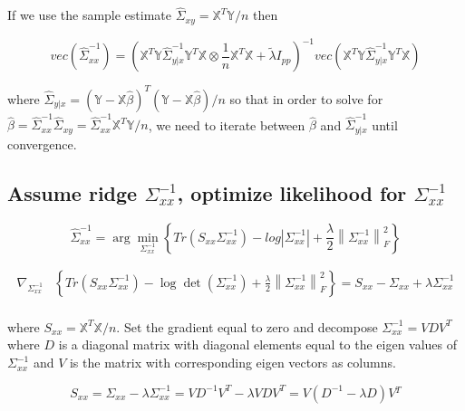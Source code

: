 \documentclass[11pt,]{book}
\theoremstyle{definition}
\theoremstyle{definition}
\theoremstyle{definition}
\theoremstyle{remark}
\begin{document}
If we use the sample estimate
\(\hat{\Sigma}_{xy} = \mathbb{X}^{T}\mathbb{Y}/n\) then

\[ vec\left( \hat{\Sigma}_{xx}^{-1} \right) = \left( \mathbb{X}^{T}\mathbb{Y}\hat{\Sigma}_{y | x}^{-1}\mathbb{Y}^{T}\mathbb{X} \otimes \frac{1}{n}\mathbb{X}^{T}\mathbb{X} + \tilde{\lambda}I_{pp} \right)^{-1}vec\left( \mathbb{X}^{T}\mathbb{Y}\hat{\Sigma}_{y | x}^{-1}\mathbb{Y}^{T}\mathbb{X} \right) \]

where
\(\hat{\Sigma}_{y | x} = (\mathbb{Y} - \mathbb{X}\hat{\beta} )^{T}(\mathbb{Y} - \mathbb{X}\hat{\beta})/n\)
so that in order to solve for
\(\hat{\beta} = \hat{\Sigma}_{xx}^{-1}\hat{\Sigma}_{xy} = \hat{\Sigma}_{xx}^{-1}\mathbb{X}^{T}\mathbb{Y}/n\),
we need to iterate between \(\hat{\beta}\) and
\(\hat{\Sigma}_{y | x}^{-1}\) until convergence.

\vspace{0.5cm}

\hypertarget{assume-ridge-sigma_xx-1-optimize-likelihood-for-sigma_xx-1}{%
\subsection{\texorpdfstring{Assume ridge \(\Sigma_{xx}^{-1}\), optimize
likelihood for
\(\Sigma_{xx}^{-1}\)}{Assume ridge \textbackslash{}Sigma\_\{xx\}\^{}\{-1\}, optimize likelihood for \textbackslash{}Sigma\_\{xx\}\^{}\{-1\}}}\label{assume-ridge-sigma_xx-1-optimize-likelihood-for-sigma_xx-1}}

\[ \hat{\Sigma}_{xx}^{-1} = \arg\min_{\Sigma_{xx}^{-1}}\left\{ Tr\left( S_{xx}\Sigma_{xx}^{-1} \right) - log\left| \Sigma_{xx}^{-1} \right| + \frac{\lambda}{2}\left\| \Sigma_{xx}^{-1} \right\|_{F}^{2} \right\} \]

\begin{align*}
  \nabla_{\Sigma_{xx}^{-1}}&\left\{ Tr\left( S_{xx}\Sigma_{xx}^{-1} \right) - \log\det\left( \Sigma_{xx}^{-1} \right) + \frac{\lambda}{2}\left\| \Sigma_{xx}^{-1} \right\|_{F}^{2} \right\} = S_{xx} - \Sigma_{xx} + \lambda\Sigma_{xx}^{-1} \\
\end{align*}

where \(S_{xx} = \mathbb{X}^{T}\mathbb{X}/n\). Set the gradient equal to
zero and decompose \(\Sigma_{xx}^{-1} = VDV^{T}\) where \(D\) is a
diagonal matrix with diagonal elements equal to the eigen values of
\(\Sigma_{xx}^{-1}\) and \(V\) is the matrix with corresponding eigen
vectors as columns.

\[ S_{xx} = \Sigma_{xx} - \lambda\Sigma_{xx}^{-1} = VD^{-1}V^{T} - \lambda VDV^{T} = V\left(D^{-1} - \lambda D \right)V{^T} \]
\end{document}
